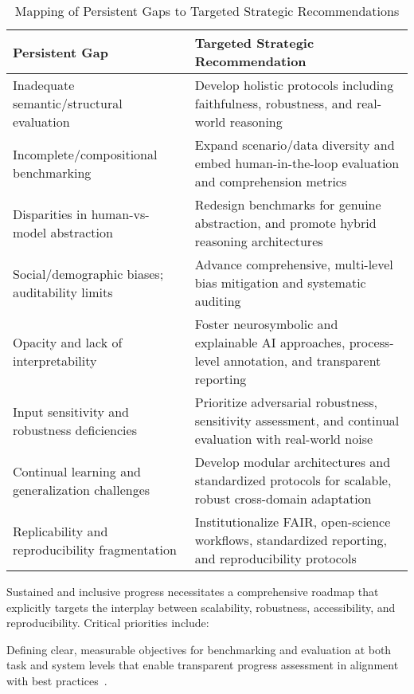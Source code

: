 \documentclass[sigconf]{acmart}
\begin{document}
\begin{table*}[htbp]
\centering
\caption{Mapping of Persistent Gaps to Targeted Strategic Recommendations}
\label{tab:gap_strategy_overview}
\begin{adjustbox}{max width=\textwidth}
\begin{tabular}{ll}
\toprule
\textbf{Persistent Gap} & \textbf{Targeted Strategic Recommendation} \\
\midrule
Inadequate semantic/structural evaluation & Develop holistic protocols including faithfulness, robustness, and real-world reasoning \\
Incomplete/compositional benchmarking & Expand scenario/data diversity and embed human-in-the-loop evaluation and comprehension metrics \\
Disparities in human-vs-model abstraction & Redesign benchmarks for genuine abstraction, and promote hybrid reasoning architectures \\
Social/demographic biases; auditability limits & Advance comprehensive, multi-level bias mitigation and systematic auditing \\
Opacity and lack of interpretability & Foster neurosymbolic and explainable AI approaches, process-level annotation, and transparent reporting \\
Input sensitivity and robustness deficiencies & Prioritize adversarial robustness, sensitivity assessment, and continual evaluation with real-world noise \\
Continual learning and generalization challenges & Develop modular architectures and standardized protocols for scalable, robust cross-domain adaptation \\
Replicability and reproducibility fragmentation & Institutionalize FAIR, open-science workflows, standardized reporting, and reproducibility protocols \\
\bottomrule
\end{tabular}
\end{adjustbox}
\end{table*}

Sustained and inclusive progress necessitates a comprehensive roadmap that explicitly targets the interplay between scalability, robustness, accessibility, and reproducibility. Critical priorities include:

Defining clear, measurable objectives for benchmarking and evaluation at both task and system levels that enable transparent progress assessment in alignment with best practices~\cite{ref10,ref17,ref34,ref101,ref102,ref104,ref105,ref106,ref107,ref108}.
\end{document}
